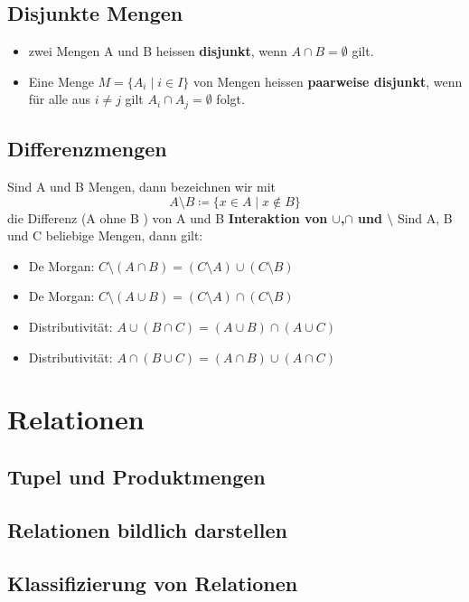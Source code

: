 \subsection{Disjunkte Mengen}
\begin{itemize}
    \item zwei Mengen A und B heissen {\bf disjunkt}, wenn $A \cap B = \emptyset$ gilt.
    \item Eine Menge $M = \{A_i \mid i \in I\}$ von Mengen heissen {\bf paarweise disjunkt}, 
    wenn für alle aus $i \neq j$ gilt $A_i \cap A_j = \emptyset$ folgt.
\end{itemize}
\subsection{Differenzmengen}
Sind A und B Mengen, dann bezeichnen wir mit
\begin{equation}
    A \setminus B \coloneqq \{x \in A \mid x \notin B\}
\end{equation}
die Differenz (A ohne B ) von A und B
{\bf Interaktion von $\cup$,$\cap$ und $\setminus$}
Sind A, B und C beliebige Mengen, dann gilt:
\begin{itemize}
    \item De Morgan: $C \setminus (A \cap B) = (C \setminus A) \cup (C \setminus B)$
    \item De Morgan: $C \setminus (A \cup B) = (C \setminus A) \cap (C \setminus B)$
    \item Distributivität: $A \cup (B \cap C) = (A \cup B) \cap (A \cup C)$
    \item Distributivität: $A \cap (B \cup C) = (A \cap B) \cup (A \cap C)$
\end{itemize}
\section{Relationen}
\subsection{Tupel und Produktmengen}
\subsection{Relationen bildlich darstellen}
\subsection{Klassifizierung von Relationen}  